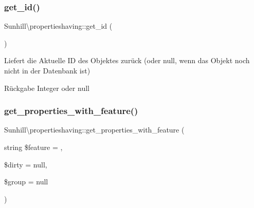 \mbox{\label{classSunhill_1_1propertieshaving_aecbff22fc3e0d9767d699e7cc60e6cfe}} 
\subsubsection{\texorpdfstring{get\+\_\+id()}{get\_id()}}
{\footnotesize\ttfamily Sunhill\textbackslash{}propertieshaving\+::get\+\_\+id (\begin{DoxyParamCaption}{ }\end{DoxyParamCaption})}

Liefert die Aktuelle ID des Objektes zurück (oder null, wenn das Objekt noch nicht in der Datenbank ist) \begin{DoxyReturn}{Rückgabe}
Integer oder null 
\end{DoxyReturn}
\mbox{\label{classSunhill_1_1propertieshaving_a31b03c95e2835f0a21012da3a6e97b06}} 
\subsubsection{\texorpdfstring{get\+\_\+properties\+\_\+with\+\_\+feature()}{get\_properties\_with\_feature()}}
{\footnotesize\ttfamily Sunhill\textbackslash{}propertieshaving\+::get\+\_\+properties\+\_\+with\+\_\+feature (\begin{DoxyParamCaption}\item[{string}]{\$feature = {\ttfamily \textquotesingle{}\textquotesingle{}},  }\item[{}]{\$dirty = {\ttfamily null},  }\item[{}]{\$group = {\ttfamily null} }\end{DoxyParamCaption})}

